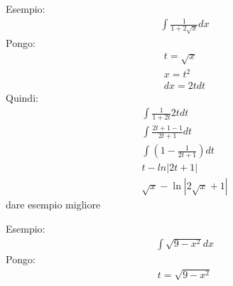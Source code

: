 \documentclass{article}
\begin{document}
Esempio:
\begin{gather*}
    \int \frac{1}{1 + 2\sqrt{x}}dx
\end{gather*}
Pongo:
\begin{gather*}
    t = \sqrt{x}\\
    x = t^2\\
    dx = 2tdt
\end{gather*}
Quindi:
\begin{gather*}
    \int \frac{1}{1 + 2t} 2t dt\\
    \int \frac{2t + 1 - 1}{2t + 1}dt\\
    \int (1 - \frac{1}{2t + 1})dt\\
    t - ln|2t + 1|\\
    \sqrt{x} - \ln|2\sqrt{x} + 1|
\end{gather*}
dare esempio migliore

Esempio:
\begin{gather*}
    \int \sqrt{9-x^2}dx
\end{gather*}
Pongo:
\begin{gather*}
    t = \sqrt{9-x^2}
\end{gather*}
\end{document}
